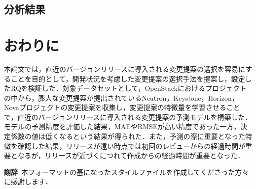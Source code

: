 \documentclass[T,J]{fose} %
\begin{document}
\subsection{分析結果}

\section{おわりに}\label{chap:fig-tab-exp}

本論文では，直近のバージョンリリースに導入される変更提案の選択を容易にすることを目的として，開発状況を考慮した変更提案の選択手法を提案し，設定したRQを検証した．対象データセットとして，OpenStackにおけるプロジェクトの中から，膨大な変更提案が提出されているNeutron，Keystone，Horizon，Novaプロジェクトの変更提案を収集し，変更提案の特徴量を学習させることで，直近のバージョンリリースに導入される変更提案の予測モデルを構築した．モデルの予測精度を評価した結果，MAEやRMSEが高い精度であった一方，決定係数の値は低くなるという結果が得られた．また，予測の際に重要となった特徴を確認した結果，リリースが遠い時点では初回のレビューからの経過時間が重要となるが，リリースが近づくにつれて作成からの経過時間が重要となった．

\textbf{謝辞}\
本フォーマットの基になったスタイルファイルを作成してくださった方々に感謝します．

%
%

\end{document}
